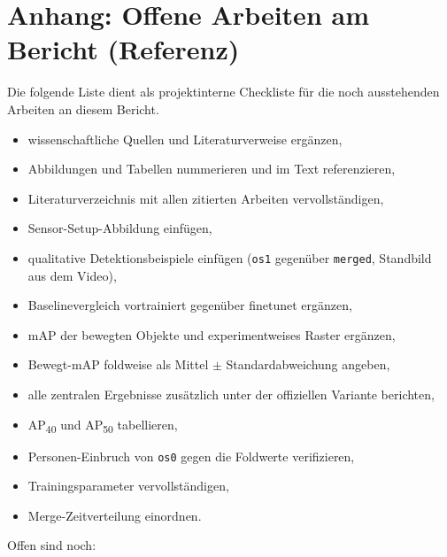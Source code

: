 \section{Anhang: Offene Arbeiten am Bericht (Referenz)}

Die folgende Liste dient als projektinterne Checkliste für die noch ausstehenden Arbeiten an diesem Bericht.

\begin{itemize}
    \item[\checkmark] wissenschaftliche Quellen und Literaturverweise ergänzen,
    \item[\checkmark] Abbildungen und Tabellen nummerieren und im Text referenzieren,
    \item[\checkmark] Literaturverzeichnis mit allen zitierten Arbeiten vervollständigen,
    \item[\checkmark] Sensor-Setup-Abbildung einfügen,
    \item[\checkmark] qualitative Detektionsbeispiele einfügen (\texttt{os1} gegenüber \texttt{merged}, Standbild aus dem Video),
    \item[\checkmark] Baselinevergleich vortrainiert gegenüber finetunet ergänzen,
    \item[\checkmark] mAP der bewegten Objekte und experimentweises Raster ergänzen,
    \item[\checkmark] Bewegt-mAP foldweise als Mittel \(\pm\) Standardabweichung angeben,
    \item[\checkmark] alle zentralen Ergebnisse zusätzlich unter der offiziellen Variante berichten,
    \item[\checkmark] AP\textsubscript{40} und AP\textsubscript{50} tabellieren,
    \item[\checkmark] Personen-Einbruch von \texttt{os0} gegen die Foldwerte verifizieren,
    \item[\checkmark] Trainingsparameter vervollständigen,
    \item[\checkmark] Merge-Zeitverteilung einordnen.
\end{itemize}

\noindent Offen sind noch:

